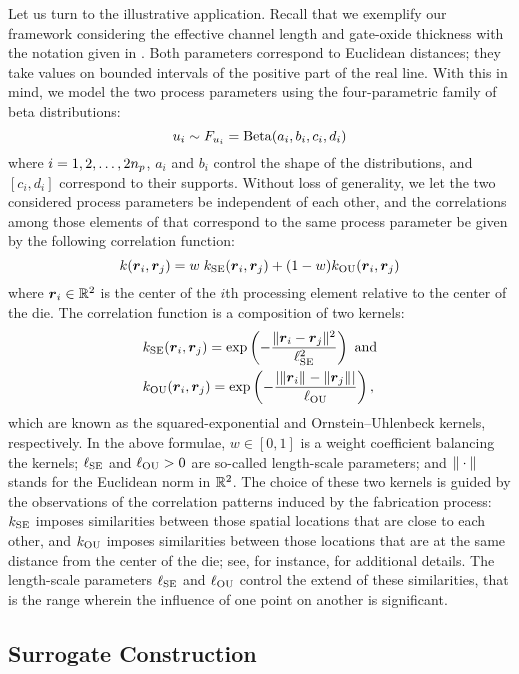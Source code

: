 Let us turn to the illustrative application. Recall that we exemplify our
framework considering the effective channel length and gate-oxide thickness with
the notation given in . Both parameters
correspond to Euclidean distances; they take values on bounded intervals of the
positive part of the real line. With this in mind, we model the two process
parameters using the four-parametric family of beta distributions:
\[
  u_i \sim F_{u_i} = \mathrm{Beta}(a_i, b_i, c_i, d_i)
\]
where $i = 1, 2, \dots, 2 {n_{p}}$, $a_i$ and $b_i$ control the shape of the
distributions, and $[c_i, d_i]$ correspond to their supports. Without loss of
generality, we let the two considered process parameters be independent of each
other, and the correlations among those elements of \vu that correspond to the
same process parameter be given by the following correlation function:
\[
  k(\boldsymbol{r}_i, \boldsymbol{r}_j) = w \; k_{\mathrm{SE}}(\boldsymbol{r}_i, \boldsymbol{r}_j) + (1 - w) k_{\mathrm{OU}}(\boldsymbol{r}_i, \boldsymbol{r}_j)
\]
where $\boldsymbol{r}_i \in \mathbb{R}^2$ is the center of the $i$th processing element
relative to the center of the die. The correlation function is a composition of
two kernels:
\begin{align*}
  & k_{\mathrm{SE}}(\boldsymbol{r}_i, \boldsymbol{r}_j) = \exp\left(- \frac{\|\boldsymbol{r}_i - \boldsymbol{r}_j\|_{}^2}{\ell_{\mathrm{SE}}^2} \right) \text{ and} \\
  & k_{\mathrm{OU}}(\boldsymbol{r}_i, \boldsymbol{r}_j) = \exp\left(- \frac{|\|\boldsymbol{r}_i\|_{} - \|\boldsymbol{r}_j\|_{}|}{\ell_{\mathrm{OU}}} \right),
\end{align*}
which are known as the squared-exponential and Ornstein--Uhlenbeck kernels,
respectively. In the above formulae, $w \in [0, 1]$ is a weight coefficient
balancing the kernels; $\ell_{\mathrm{SE}}$ and $\ell_{\mathrm{OU}} > 0$ are so-called length-scale
parameters; and $\|\cdot\|_{}$ stands for the Euclidean norm in $\mathbb{R}^2$. The
choice of these two kernels is guided by the observations of the correlation
patterns induced by the fabrication process: $k_{\mathrm{SE}}$ imposes similarities
between those spatial locations that are close to each other, and $k_{\mathrm{OU}}$
imposes similarities between those locations that are at the same distance from
the center of the die; see, for instance, \cite{friedberg2005} for additional
details. The length-scale parameters $\ell_{\mathrm{SE}}$ and $\ell_{\mathrm{OU}}$ control the
extend of these similarities, that is the range wherein the influence of one
point on another is significant.

\subsection{Surrogate Construction}

